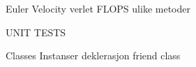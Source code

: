 
Euler
Velocity verlet
FLOPS ulike metoder

UNIT TESTS

Classes
	Instanser
	deklerasjon
	friend class
	